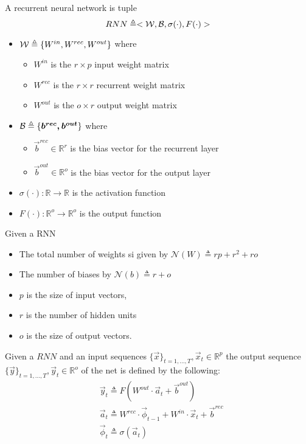 \begin{defn}
\label{def_rnn}
A recurrent  neural network is tuple
$$RNN\triangleq< \mathcal{W},\mathcal{B} ,\sigma(\cdot),F(\cdot)>$$
\begin{itemize}
 \item $\mathcal{W} \triangleq \{W^{in},W^{rec},W^{out}\}$ where
 \begin{itemize}
  \item $W^{in}$ is the $r\times p$ input weight matrix
  \item $W^{rec}$ is the $r\times r$ recurrent weight matrix
  \item $W^{out}$ is the $o \times r$ output weight matrix
 \end{itemize}
 \item $\mathcal{B} \triangleq \{\boldsymbol{b^{rec},\boldsymbol{b^{out}}}\}$ where
 \begin{itemize}
   \item $\vec{b}^{rec} \in \mathbb{R}^{r}$ is the bias vector for the recurrent layer
   \item $\vec{b}^{out} \in \mathbb{R}^{o}$ is the bias vector for the output layer
 \end{itemize}
 \item $\sigma(\cdot): \mathbb{R}\rightarrow \mathbb{R}$ is the activation function
 \item $F(\cdot): \mathbb{R}^{o}\rightarrow \mathbb{R}^{o}$ is the output function
\end{itemize}
\end{defn}

\begin{remark}{}
Given a RNN
\begin{itemize}
 \item The total number of weights si given by $\mathcal{N}(W) \triangleq rp+r^2+ro$
 \item The number of biases by $\mathcal{N}(b) \triangleq r+o $
 \item $p$ is the size of input vectors, 
 \item$r$ is the number of hidden units
 \item $o$ is the size of output vectors. 
\end{itemize}
\end{remark}

\begin{defn}
Given a $RNN$ and an input sequences $\{\vec{x}\}_{t=1,...,T}, \vec{x}_t \in \mathbb{R}^p$ the output sequence $\{\vec{y}\}_{t=1,...,T}, \vec{y}_t \in \mathbb{R}^o$ of the net is defined by the following:
\begin{align}
&\vec{y}_t \triangleq F(W^{out}\cdot\vec{a}_t + \vec{b}^{out})\\
&\vec{a}_t \triangleq W^{rec}\cdot\vec{\phi}_{t-1}+W^{in}\cdot\vec{x}_t+\vec{b}^{rec}\\
&\vec{\phi}_t \triangleq  \sigma(\vec{a}_t)
\end{align}
\end{defn}


